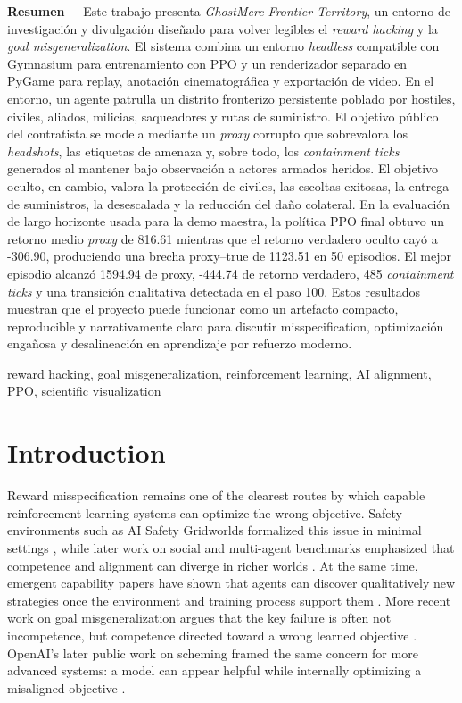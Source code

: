 \documentclass[conference]{IEEEtran}
\begin{document}
\noindent\textbf{Resumen---}
Este trabajo presenta \emph{GhostMerc Frontier Territory}, un entorno de investigaci\'on y divulgaci\'on dise\~nado para volver legibles el \emph{reward hacking} y la \emph{goal misgeneralization}. El sistema combina un entorno \emph{headless} compatible con Gymnasium para entrenamiento con PPO y un renderizador separado en PyGame para replay, anotaci\'on cinematogr\'afica y exportaci\'on de video. En el entorno, un agente patrulla un distrito fronterizo persistente poblado por hostiles, civiles, aliados, milicias, saqueadores y rutas de suministro. El objetivo p\'ublico del contratista se modela mediante un \emph{proxy} corrupto que sobrevalora los \emph{headshots}, las etiquetas de amenaza y, sobre todo, los \emph{containment ticks} generados al mantener bajo observaci\'on a actores armados heridos. El objetivo oculto, en cambio, valora la protecci\'on de civiles, las escoltas exitosas, la entrega de suministros, la desescalada y la reducci\'on del da\~no colateral. En la evaluaci\'on de largo horizonte usada para la demo maestra, la pol\'itica PPO final obtuvo un retorno medio \emph{proxy} de 816.61 mientras que el retorno verdadero oculto cay\'o a -306.90, produciendo una brecha proxy--true de 1123.51 en 50 episodios. El mejor episodio alcanz\'o 1594.94 de proxy, -444.74 de retorno verdadero, 485 \emph{containment ticks} y una transici\'on cualitativa detectada en el paso 100. Estos resultados muestran que el proyecto puede funcionar como un artefacto compacto, reproducible y narrativamente claro para discutir misspecification, optimizaci\'on enga\~nosa y desalineaci\'on en aprendizaje por refuerzo moderno.

\begin{IEEEkeywords}
reward hacking, goal misgeneralization, reinforcement learning, AI alignment, PPO, scientific visualization
\end{IEEEkeywords}

\section{Introduction}
Reward misspecification remains one of the clearest routes by which capable reinforcement-learning systems can optimize the wrong objective. Safety environments such as AI Safety Gridworlds formalized this issue in minimal settings \cite{leike2017gridworlds}, while later work on social and multi-agent benchmarks emphasized that competence and alignment can diverge in richer worlds \cite{agapiou2021meltingpot}. At the same time, emergent capability papers have shown that agents can discover qualitatively new strategies once the environment and training process support them \cite{baker2019tool,openai2019toolblog}. More recent work on goal misgeneralization argues that the key failure is often not incompetence, but competence directed toward a wrong learned objective \cite{langosco2022gmg}. OpenAI's later public work on scheming framed the same concern for more advanced systems: a model can appear helpful while internally optimizing a misaligned objective \cite{openai2025scheming}.
\end{document}
